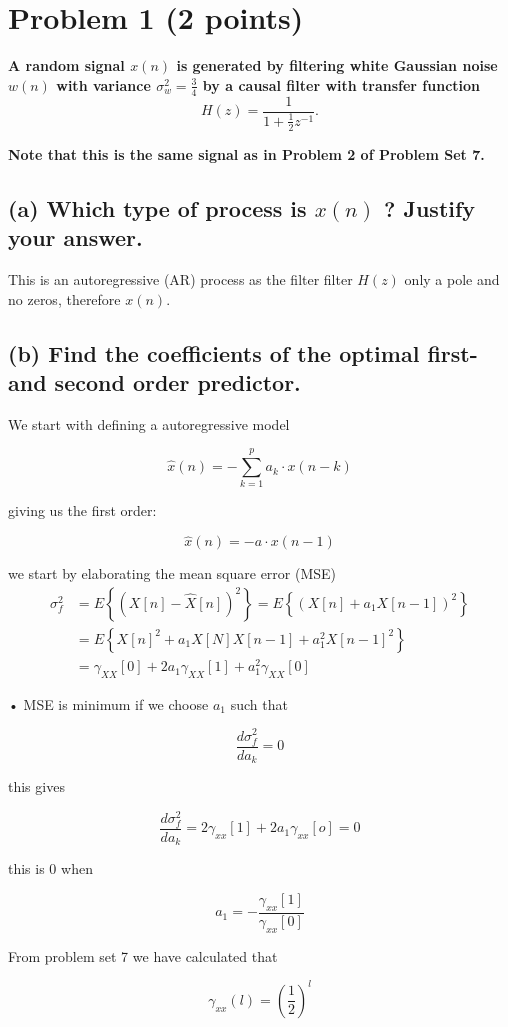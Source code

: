 \section{Problem 1 (2 points)}
\textbf{A random signal $x(n)$ is generated by filtering white Gaussian noise $w(n)$ with variance $\sigma_w^2=\frac{3}{4}$ by a causal filter with transfer function}
$$
H(z)=\frac{1}{1+\frac{1}{2} z^{-1}} .
$$

\textbf{Note that this is the same signal as in Problem 2 of Problem Set 7.}
\subsection*{(a) Which type of process is $x(n)$ ? Justify your answer.}

This is an autoregressive (AR) process as the filter  filter $H(z)$ only a pole and no zeros, therefore $x(n)$.

\subsection*{(b) Find the coefficients of the optimal first- and second order predictor.}
We start with defining a autoregressive model 

$$\hat{x}(n)=-\sum_{k=1}^{p}a_k\cdot x(n-k)$$

giving us the first order:

$$\hat{x}(n)=-a\cdot x(n-1)$$

we start by elaborating the mean square error (MSE)
$$
\begin{aligned}
\sigma_f^2 & =E\left\{(X[n]-\hat{X}[n])^2\right\}=E\left\{\left(X[n]+a_1 X[n-1]\right)^2\right\} \\
& = E\left\{X[n]^2+a_1 X[N]X[n-1]+a_1^2X[n-1]^2\right\} \\
& =\gamma_{X X}[0]+2 a_1 \gamma_{X X}[1]+a_1^2 \gamma_{X X}[0]
\end{aligned}
$$

• MSE is minimum if we choose $a_1$ such that

$$\frac{d\sigma_f^2}{da_k}=0$$

this gives 

$$\frac{d\sigma_f^2}{da_k}=2\gamma_{xx}[1]+2a_1\gamma_{xx}[o]=0$$

this is 0 when 

$$a_1=-\frac{\gamma_{xx}[1]}{\gamma_{xx}[0]}$$

From problem set 7 we have calculated that

$$\gamma_{xx}(l)=\left(\frac{1}{2}\right)^{l}$$

